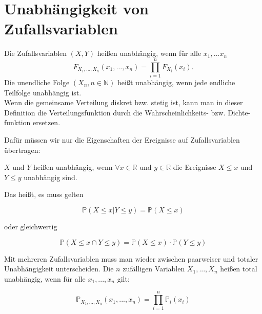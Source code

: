 {    


    \section{Unabhängigkeit von Zufallsvariablen}

    \begin{definition}\label{def:unabhaengigkeit_verteilung}
        Die Zufallsvariablen $(X,Y)$ heißen unabhängig, wenn für
        alle $x_1,\dots x_n$
        \[F_{X_1,\dots,X_n}(x_1,\dots,x_n)=\prod_{i=1}^nF_{X_i}(x_i).\]
        Die unendliche Folge $(X_n,n\in\mathbb N)$ heißt unabhängig, wenn
        jede endliche Teilfolge unabhängig ist.\\


        Wenn die gemeinsame Verteilung diskret bzw. stetig ist, kann man in dieser
        Definition die Verteilungsfunktion durch die Wahrscheinlichkeits- bzw. Dichte-
        funktion ersetzen.
    \end{definition}

    Dafür müssen wir nur die Eigenschaften der Ereignisse auf
    Zufallsvariablen übertragen:

    \begin{definition}
        $X$ und $Y$ heißen unabhängig, wenn $\forall x\in \mathbb R$ und $y\in \mathbb R$
        die Ereignisse $X\le x$ und $Y\le y$ unabhängig sind.

        Das heißt, es muss gelten

        \[
            \mathbb{P}\left(X\le x|Y\le y\right)=\mathbb P(X\le x)
        \]

        oder gleichwertig

        \[
            \mathbb P\left(X\le x\cap Y\le y\right)=
            \mathbb P\left(X\le x\right)\cdot \mathbb P\left(Y\le y\right)
        \]
    \end{definition}

    Mit mehreren Zufallsvariablen muss man wieder zwischen paarweiser und
    totaler Unabhängigkeit unterscheiden. Die $n$ zufälligen Variablen $X_{1},...,X_{n}$
    heißen total unabhängig, wenn für alle $x_{1},...,x_{n}$ gilt:

    \[
    \mathbb P_{X_{1},... ,X_{n}}\left(x_{1},... ,x_{n}\right)=\prod_{i=1}^n{\mathbb P_{i}(x_{i})}
    \]

}
